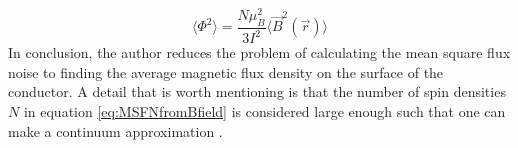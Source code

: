 \begin{equation}
    \langle \Phi^2 \rangle = \frac{N\mu_B^2}{3I^2}\langle \Vec{B}^2(\Vec{r}) \rangle
    \label{eq:MSFNfromBfield}
\end{equation}
In conclusion, the author reduces the problem of calculating the mean square flux noise to finding the average magnetic flux density on the surface of the conductor. A detail that is worth mentioning is that the number of spin densities $N$ in equation \ref{eq:MSFNfromBfield} is considered large enough such that one can make a continuum approximation \cite{fluxNoiseSquidsStevenAnton}.

